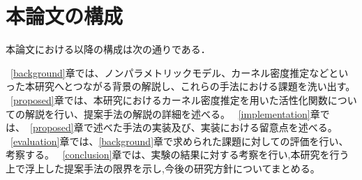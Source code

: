 \section{本論文の構成}

本論文における以降の構成は次の通りである．

~\ref{background}章では、ノンパラメトリックモデル、カーネル密度推定などといった本研究へとつながる背景の解説し、これらの手法における課題を洗い出す。
~\ref{proposed}章では、本研究におけるカーネル密度推定を用いた活性化関数についての解説を行い、提案手法の解説の詳細を述べる。
~\ref{implementation}章では、~\ref{proposed}章で述べた手法の実装及び、実装における留意点を述べる。
~\ref{evaluation}章では、\ref{background}章で求められた課題に対しての評価を行い、考察する。
~\ref{conclusion}章では、実験の結果に対する考察を行い,本研究を行う上で浮上した提案手法の限界を示し,今後の研究方針についてまとめる。






